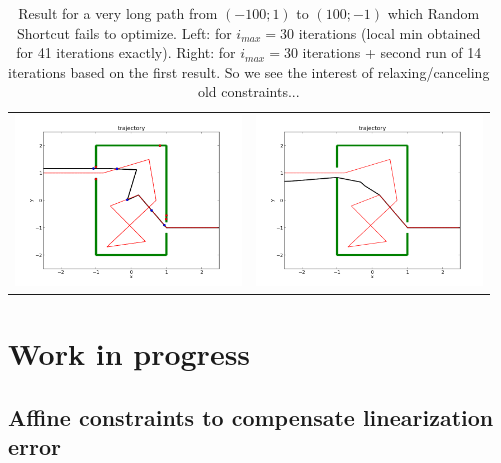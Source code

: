 \documentclass {article}
\begin{document}
\begin{table}[h]
\centering
\begin{tabular}{cc}
	\includegraphics[width=6cm]{WEIGHTED_long_box100.png} &
	\includegraphics[width=6cm]{WEIGHTED_long_box100_2x.png}
\end{tabular}
	\caption{Result for a very long path from $(-100;1)$ to $(100;-1)$ which 
	Random Shortcut fails to optimize. Left: for $i_{max} = 30$ iterations 
	(local min obtained for 41 iterations exactly). Right: for $i_{max} = 30$ 
	iterations + second run of 14 iterations based on the first result. So we see 
	the interest of relaxing/canceling old constraints...}
\end{table}

\vspace{0.4cm}

\newpage
\section{Work in progress}

\subsection{Affine constraints to compensate linearization error}
\end{document}
